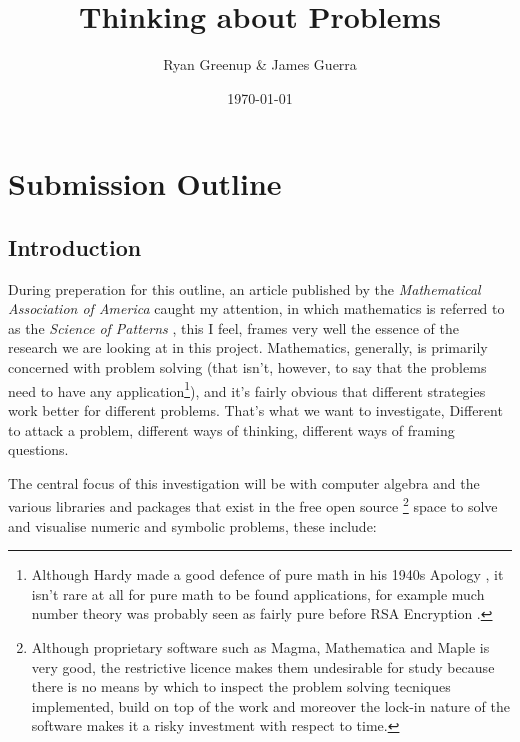 \documentclass[11pt]{article}
\author{Ryan Greenup \& James Guerra}
\date{\today}
\title{Thinking about Problems}
\begin{document}
\maketitle
\tableofcontents


\section{Submission Outline}
\label{sec:org8f28beb}
\subsection{Introduction}
\label{sec:orgdeea0fc}

During preperation for this outline, an article published by the \emph{Mathematical
Association of America} caught my attention, in which mathematics is referred to
as the \emph{Science of Patterns} \cite{friedMathematicsSciencePatterns2010}, this I
feel, frames very well the essence of the research we are looking at in this
project. Mathematics, generally, is primarily concerned with problem solving
(that isn't, however, to say that the problems need to have any
application\footnote{Although Hardy made a good defence of pure math in his 1940s Apology \cite{hardyMathematicianApology2012}, it isn't rare at all for pure math to be found applications, for example much number theory was probably seen as fairly pure before RSA Encryption \cite{spraulHowSoftwareWorks2015}.}), and it's fairly obvious that different strategies work
better for different problems. That's what we want to investigate, Different to
attack a problem, different ways of thinking, different ways of framing
questions.

The central focus of this investigation will be with computer algebra and the
various libraries and packages that exist in the free open source \footnote{Although proprietary software such as Magma, Mathematica and Maple is very good, the restrictive licence makes them undesirable for study because there is no means by which to inspect the problem solving tecniques implemented, build on top of the work and moreover the lock-in nature of the software makes it a risky investment with respect to time.} space to solve
and visualise numeric and symbolic problems, these include:
\end{document}
